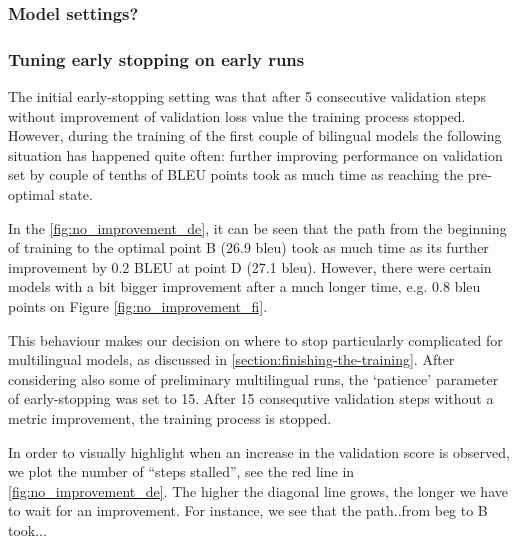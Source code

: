 \subsubsection*{Model settings?}


\subsubsection*{Tuning early stopping on early runs}

The initial \gls{early-stopping} setting was that after 5 consecutive
validation steps without improvement of validation \gls{loss} value
the training process stopped.
However, during the training of the first couple of bilingual models
the following situation has happened quite often:
further improving performance on validation set by
couple of tenths of BLEU points took as much time as reaching
the pre-optimal state.

In the \cref{fig:no_improvement_de}, it  can be seen that the path from
the beginning of training to the optimal point B (26.9 \acrshort{bleu})
took as much time as its further improvement by 0.2 BLEU
at point D (27.1 \acrshort{bleu}). However, there were certain models
with a bit bigger improvement after a much longer time, e.g.
0.8 \acrshort{bleu} points on Figure \ref{fig:no_improvement_fi}.

This behaviour makes our decision on where to stop particularly
complicated for multilingual models, as discussed in
\cref{section:finishing-the-training}.
After considering also some of preliminary multilingual runs,
the `patience' parameter of \gls{early-stopping} was set to 15.
After 15 consequtive validation steps without a metric improvement,
the training process is stopped.

In order to visually highlight when an increase in the validation score
is observed, we plot the number of ``steps stalled'',
see the red line in \cref{fig:no_improvement_de}.
The higher the diagonal line grows, the longer we have to wait for an improvement.
For instance, we see that the path..from beg to B took...

